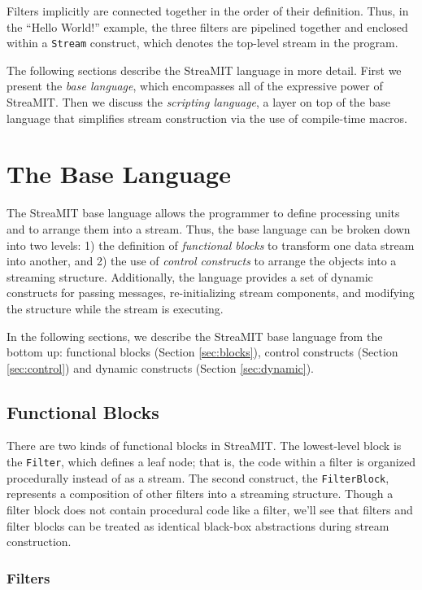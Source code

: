 \documentclass[draft]{article}
\begin{document}
Filters implicitly are connected together in the order of their
definition.  Thus, in the ``Hello World!'' example, the three filters
are pipelined together and enclosed within a {\tt Stream} construct,
which denotes the top-level stream in the program.

The following sections describe the StreaMIT language in more detail.
First we present the {\it base language}, which encompasses all of the
expressive power of StreaMIT.  Then we discuss the {\it scripting
language}, a layer on top of the base language that simplifies stream
construction via the use of compile-time macros.

\section{The Base Language}

The StreaMIT base language allows the programmer to define processing
units and to arrange them into a stream.  Thus, the base language can
be broken down into two levels: 1) the definition of {\it functional
blocks} to transform one data stream into another, and 2) the use of
{\it control constructs} to arrange the objects into a streaming
structure.  Additionally, the language provides a set of dynamic
constructs for passing messages, re-initializing stream components,
and modifying the structure while the stream is executing.

In the following sections, we describe the StreaMIT base language from
the bottom up: functional blocks (Section \ref{sec:blocks}), control
constructs (Section \ref{sec:control}) and dynamic constructs (Section
\ref{sec:dynamic}).

\subsection{Functional Blocks}
\protect\label{sec:blocks}

There are two kinds of functional blocks in StreaMIT.  The
lowest-level block is the {\tt Filter}, which defines a leaf node;
that is, the code within a filter is organized procedurally instead of
as a stream.  The second construct, the {\tt FilterBlock}, represents
a composition of other filters into a streaming structure.  Though a
filter block does not contain procedural code like a filter, we'll see
that filters and filter blocks can be treated as identical black-box
abstractions during stream construction.

\subsubsection{Filters}
\end{document}
